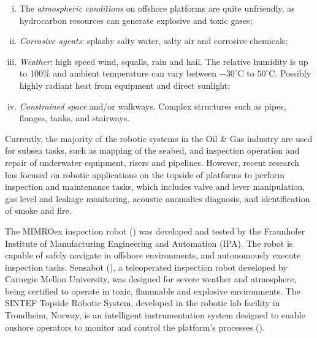 \begin{enumerate}[i)]
\item The \emph{atmospheric conditions} on offshore platforms are quite unfriendly, as
hydrocarbon resources can generate explosive and toxic gases;\\ %
\item \emph{Corrosive agents}: splashy salty water, salty air and corrosive chemicals;\\
\item \emph{Weather}: high speed wind, squalls, rain and hail. The relative humidity is up to
100\% and ambient temperature can vary between $-30^{\circ}$C to $50^{\circ}$C. Possibly highly radiant heat from equipment and direct sunlight;\\
\item \emph{Constrained space} and/or walkways. Complex structures such as pipes,
flanges, tanks, and stairways.
\end{enumerate}


Currently, the majority of the robotic systems in the Oil \& Gas industry are
used for subsea tasks, such as mapping of the seabed, and inspection operation
and repair of underwater equipment, risers and pipelines. However, recent research has focused on robotic applications on the topside of platforms to perform inspection and maintenance tasks, which includes valve and lever manipulation, gas level and leakage monitoring, acoustic anomalies diagnosis, and identification of smoke and fire.

The MIMROex inspection robot (\cite{mimroex}) was developed and
tested by the Fraunhofer Institute of Manufacturing Engineering and Automation
(IPA). The robot is capable of safely navigate in offshore environments, and
autonomously execute inspection tasks. Sensabot (\cite{sensabot}), a
teleoperated inspection robot developed by Carnegie Mellon University, was
designed for severe weather and atmosphere, being certified to operate in toxic, flammable and explosive environments. The SINTEF Topside Robotic System, developed in the robotic lab facility in
Trondheim, Norway, is an intelligent instrumentation system designed to enable onshore operators
to monitor and control the platform's processes (\cite{kyrkjebo2009robotic}).


